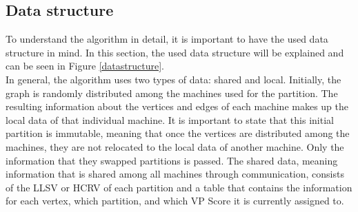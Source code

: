 \documentclass[acmsmall,nonacm,screen,review]{acmart}
\begin{document}
\subsection{Data structure}
To understand the algorithm in detail, it is important to have the used data structure in mind. In this section, the used data structure will be explained and can be seen in Figure \ref{datastructure}. \\
In general, the algorithm uses two types of data: shared and local. Initially, the graph is randomly distributed among the machines used for the partition. The resulting information about the vertices and edges of each machine makes up the local data of that individual machine. It is important to state that this initial partition is immutable, meaning that once the vertices are distributed among the machines, they are not relocated to the local data of another machine. Only the information that they swapped partitions is passed. The shared data, meaning information that is shared among all machines through communication, consists of the LLSV or HCRV of each partition and a table that contains the information for each vertex, which partition, and which VP Score it is currently assigned to.
\end{document}
